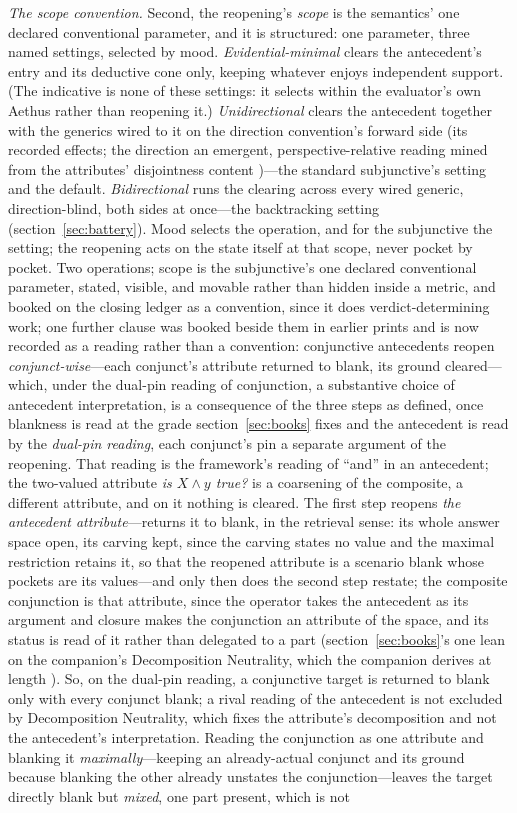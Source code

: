 \documentclass[11pt]{article}
\theoremstyle{definition}
\newcommand{\Aethus}{Aethus}
\begin{document}
\textit{The scope convention.} Second, the reopening's \emph{scope} is the semantics' one declared conventional parameter, and it is structured: one parameter, three named settings, selected by mood. \emph{Evidential-minimal} clears the antecedent's entry and its deductive cone only, keeping whatever enjoys independent support. (The indicative is none of these settings: it selects within the evaluator's own \Aethus{} rather than reopening it.) \emph{Unidirectional} clears the antecedent together with the generics wired to it on the direction convention's forward side (its recorded effects; the direction an emergent, perspective-relative reading mined from the attributes' disjointness content \cite{Aethus})---the standard subjunctive's setting and the default. \emph{Bidirectional} runs the clearing across every wired generic, direction-blind, both sides at once---the backtracking setting (section~\ref{sec:battery}). Mood selects the operation, and for the subjunctive the setting; the reopening acts on the state itself at that scope, never pocket by pocket. Two operations; scope is the subjunctive's one declared conventional parameter, stated, visible, and movable rather than hidden inside a metric, and booked on the closing ledger as a convention, since it does verdict-determining work; one further clause was booked beside them in earlier prints and is now recorded as a reading rather than a convention: conjunctive antecedents reopen \emph{conjunct-wise}---each conjunct's attribute returned to blank, its ground cleared---which, under the dual-pin reading of conjunction, a substantive choice of antecedent interpretation, is a consequence of the three steps as defined, once blankness is read at the grade section~\ref{sec:books} fixes and the antecedent is read by the \emph{dual-pin reading}, each conjunct's pin a separate argument of the reopening. That reading is the framework's reading of ``and'' in an antecedent; the two-valued attribute \emph{is $X \wedge y$ true?} is a coarsening of the composite, a different attribute, and on it nothing is cleared. The first step reopens \emph{the antecedent attribute}---returns it to blank, in the retrieval sense: its whole answer space open, its carving kept, since the carving states no value and the maximal restriction retains it, so that the reopened attribute is a scenario blank whose pockets are its values---and only then does the second step restate; the composite conjunction is that attribute, since the operator takes the antecedent as its argument and closure makes the conjunction an attribute of the space, and its status is read of it rather than delegated to a part (section~\ref{sec:books}'s one lean on the companion's Decomposition Neutrality, which the companion derives at length \cite{Aethus}). So, on the dual-pin reading, a conjunctive target is returned to blank only with every conjunct blank; a rival reading of the antecedent is not excluded by Decomposition Neutrality, which fixes the attribute's decomposition and not the antecedent's interpretation. Reading the conjunction as one attribute and blanking it \emph{maximally}---keeping an already-actual conjunct and its ground because blanking the other already unstates the conjunction---leaves the target directly blank but \emph{mixed}, one part present, which is not 
\end{document}
